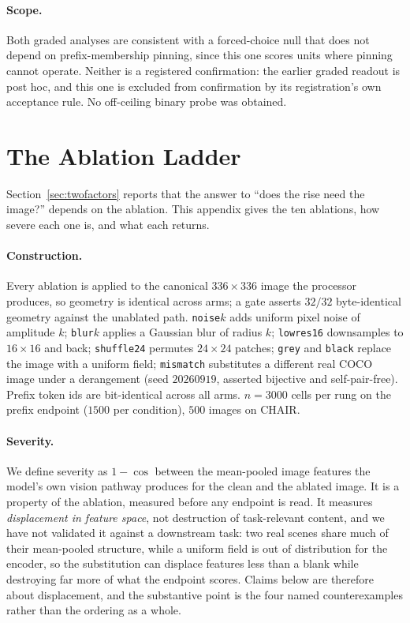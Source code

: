 \paragraph{Scope.} Both graded analyses are consistent with a forced-choice null that does not
depend on prefix-membership pinning, since this one scores units where pinning cannot operate.
Neither is a registered confirmation: the earlier graded readout is post hoc, and this one is excluded
from confirmation by its registration's own acceptance rule. No off-ceiling binary probe was
obtained.


\section{The Ablation Ladder}
\label{app:ladder}

Section~\ref{sec:twofactors} reports that the answer to ``does the rise need the image?'' depends on the
ablation. This appendix gives the ten ablations, how severe each one is, and what each returns.

\paragraph{Construction.} Every ablation is applied to the canonical $336 \times 336$ image the
processor produces, so geometry is identical across arms; a gate asserts $32/32$ byte-identical
geometry against the unablated path. \texttt{noise}$k$ adds uniform pixel noise of amplitude $k$;
\texttt{blur}$k$ applies a Gaussian blur of radius $k$; \texttt{lowres16} downsamples to $16
\times 16$ and back; \texttt{shuffle24} permutes $24 \times 24$ patches; \texttt{grey} and
\texttt{black} replace the image with a uniform field; \texttt{mismatch} substitutes a different
real COCO image under a derangement (seed $20260919$, asserted bijective and self-pair-free).
Prefix token ids are bit-identical across all arms. $n = 3000$ cells per rung on the prefix
endpoint ($1500$ per condition), $500$ images on CHAIR.

\paragraph{Severity.} We define severity as $1 - \cos$ between the mean-pooled image features the
model's own vision pathway produces for the clean and the ablated image. It is a property of the
ablation, measured before any endpoint is read. It measures \emph{displacement in feature space},
not destruction of task-relevant content, and we have not validated it against a downstream task:
two real scenes share much of their mean-pooled structure, while a uniform field is out of
distribution for the encoder, so the substitution can displace features less than a blank while
destroying far more of what the endpoint scores. Claims below are therefore about displacement, and
the substantive point is the four named counterexamples rather than the ordering as a whole.

